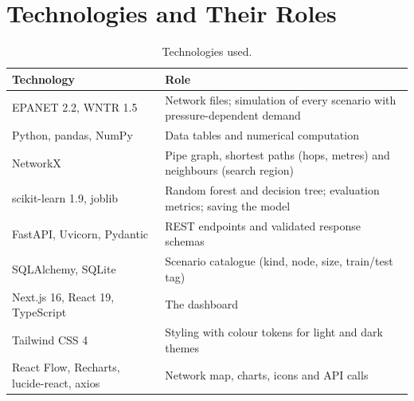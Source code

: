 \documentclass[11pt,letterpaper]{report}
\theoremstyle{definition}
\theoremstyle{plain}
\theoremstyle{remark}
\begin{document}
\section{Technologies and Their Roles}
\begin{table}[H]
\centering\small
\caption{Technologies used.}\label{tab:tech}
\begin{tabularx}{\textwidth}{@{}p{1.25in}Y@{}}
\toprule
Technology & Role \\
\midrule
EPANET 2.2, WNTR 1.5 & Network files; simulation of every scenario with pressure-dependent demand \\
Python, pandas, NumPy & Data tables and numerical computation \\
NetworkX & Pipe graph, shortest paths (hops, metres) and neighbours (search region) \\
scikit-learn 1.9, joblib & Random forest and decision tree; evaluation metrics; saving the model \\
FastAPI, Uvicorn, Pydantic & REST endpoints and validated response schemas \\
SQLAlchemy, SQLite & Scenario catalogue (kind, node, size, train/test tag) \\
Next.js 16, React 19, TypeScript & The dashboard \\
Tailwind CSS 4 & Styling with colour tokens for light and dark themes \\
React Flow, Recharts, lucide-react, axios & Network map, charts, icons and API calls \\
\bottomrule
\end{tabularx}
\end{table}
\end{document}
